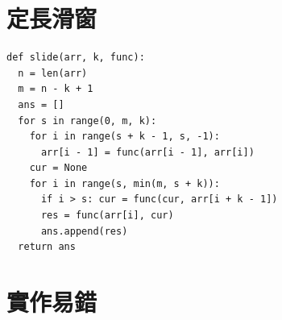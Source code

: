 \documentclass[10pt, a4paper, twocolumn]{article}
\begin{document}
\newpage

\section{定長滑窗}

\begin{verbatim}
def slide(arr, k, func):
  n = len(arr)
  m = n - k + 1
  ans = []
  for s in range(0, m, k):
    for i in range(s + k - 1, s, -1):
      arr[i - 1] = func(arr[i - 1], arr[i])
    cur = None
    for i in range(s, min(m, s + k)):
      if i > s: cur = func(cur, arr[i + k - 1])
      res = func(arr[i], cur)
      ans.append(res)
  return ans
\end{verbatim}

\section{實作易錯}
\end{document}

